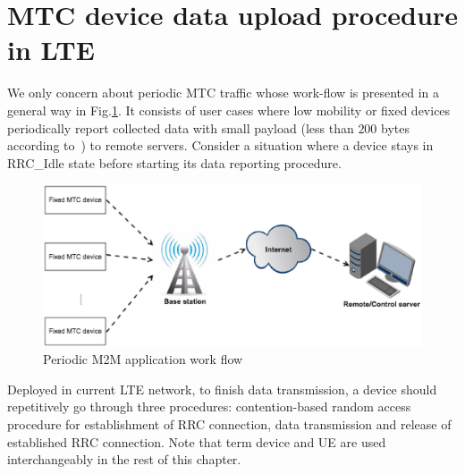 \section{MTC device data upload procedure in LTE}
\label{sec:LTE-random-access}
We only concern about periodic MTC traffic whose work-flow is presented in a general way in Fig.\ref{fig:Time-driven M2M work flow}. It consists of user cases where low mobility or fixed devices periodically report collected data with small payload (less than $200$ bytes according to~\cite{HealthInformatics}) 
to remote servers. Consider a situation where a device  stays in RRC\_Idle state before starting its data reporting procedure.
\begin{figure}[!t]
	\centering
	\includegraphics[width=\linewidth]{Chapter6/Figures/Time-driven-work-flow.eps}
	\caption{Periodic M2M application  work flow}
	\label{fig:Time-driven M2M work flow}
\end{figure}
Deployed in current LTE network, to finish data transmission, a device should repetitively go through three procedures: contention-based random access procedure for establishment of RRC connection, data transmission and release of established RRC connection. Note that term device and UE are used interchangeably in the rest of this chapter.
